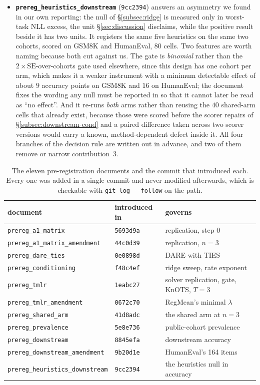 \begin{itemize}
\item \textbf{\texttt{prereg\_heuristics\_downstream}} (\texttt{9cc2394})
answers an asymmetry we found in our own reporting: the null of
\S\ref{subsec:ridge} is measured only in worst-task NLL excess, the unit
\S\ref{sec:discussion} disclaims, while the positive result beside it has
two units. It registers the same five heuristics on the same two cohorts,
scored on GSM8K and HumanEval, $80$ cells. Two features are worth naming
because both cut against us. The gate is \emph{binomial} rather than the
$2\times\mathrm{SE}$-over-cohorts gate used elsewhere, since this design has
one cohort per arm, which makes it a weaker instrument with a minimum
detectable effect of about $9$ accuracy points on GSM8K and $16$ on
HumanEval; the document fixes the wording any null must be reported in so
that it cannot later be read as ``no effect''. And it re-runs \emph{both}
arms rather than reusing the $40$ shared-arm cells that already exist,
because those were scored before the scorer repairs of
\S\ref{subsec:downstream-cond} and a paired difference taken across two
scorer versions would carry a known, method-dependent defect inside it. All
four branches of the decision rule are written out in advance, and two of
them remove or narrow contribution~3.
\end{itemize}

\begin{table}[htb]
\centering
\small
\caption{The eleven pre-registration documents and the commit that introduced
each. Every one was added in a single commit and never modified afterwards,
which is checkable with \texttt{git log -{}-follow} on the path.}
\label{tab:prereg-docs}
\begin{tabular}{lll}
\toprule
document & introduced in & governs \\
\midrule
\texttt{prereg\_a1\_matrix} & \texttt{5693d9a} & replication, step 0 \\
\texttt{prereg\_a1\_matrix\_amendment} & \texttt{44c0d39} & replication, $n=3$ \\
\texttt{prereg\_dare\_ties} & \texttt{0e0898d} & DARE with TIES \\
\texttt{prereg\_conditioning} & \texttt{f48c4ef} & ridge sweep, rate exponent \\
\texttt{prereg\_tmlr} & \texttt{1eabc27} & solver replication, gate, KnOTS, $T=3$ \\
\texttt{prereg\_tmlr\_amendment} & \texttt{0672c70} & RegMean's minimal $\lambda$ \\
\texttt{prereg\_shared\_arm} & \texttt{41d8adc} & the shared arm at $n=3$ \\
\texttt{prereg\_prevalence} & \texttt{5e8e736} & public-cohort prevalence \\
\texttt{prereg\_downstream} & \texttt{8845efa} & downstream accuracy \\
\texttt{prereg\_downstream\_amendment} & \texttt{9b20d1e} & HumanEval's 164 items \\
\texttt{prereg\_heuristics\_downstream} & \texttt{9cc2394} & the heuristics null in accuracy \\
\bottomrule
\end{tabular}
\end{table}

